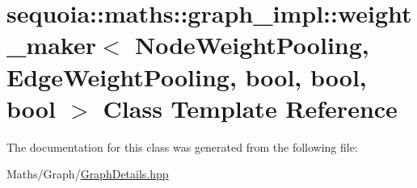 \hypertarget{classsequoia_1_1maths_1_1graph__impl_1_1weight__maker}{}\section{sequoia\+::maths\+::graph\+\_\+impl\+::weight\+\_\+maker$<$ Node\+Weight\+Pooling, Edge\+Weight\+Pooling, bool, bool, bool $>$ Class Template Reference}
\label{classsequoia_1_1maths_1_1graph__impl_1_1weight__maker}


The documentation for this class was generated from the following file\+:\begin{DoxyCompactItemize}
\item 
Maths/\+Graph/\mbox{\hyperlink{_graph_details_8hpp}{Graph\+Details.\+hpp}}\end{DoxyCompactItemize}
